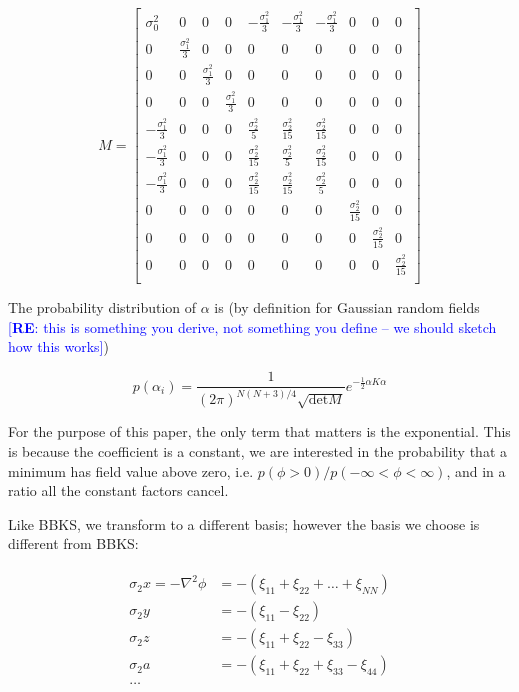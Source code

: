\documentclass[12pt]{article}
\newcommand{\re}[1]{\textcolor{blue}{[{\bf RE}: #1]}}
\begin{document}
\[
M=
  \begin{bmatrix}
    \sigma_0^2 & 0 & 0 & 0 & -\frac{\sigma_1^2}{3} &  -\frac{\sigma_1^2}{3} & -\frac{\sigma_1^2}{3} & 0 & 0 & 0\\
    0 & \frac{\sigma_1^2}{3} & 0 & 0 & 0 & 0 & 0 & 0 & 0 & 0\\
    0 & 0 & \frac{\sigma_1^2}{3} & 0 & 0 & 0 & 0 & 0 & 0 & 0\\
    0 & 0 & 0 & \frac{\sigma_1^2}{3} & 0 & 0 & 0 & 0 & 0 & 0\\
    -\frac{\sigma_1^2}{3} & 0 & 0 & 0 & \frac{\sigma_2^2}{5} & \frac{\sigma_2^2}{15} & \frac{\sigma_2^2}{15} & 0 & 0 & 0\\
    -\frac{\sigma_1^2}{3} & 0 & 0 & 0 & \frac{\sigma_2^2}{15} & \frac{\sigma_2^2}{5} & \frac{\sigma_2^2}{15} & 0 & 0 & 0\\
    -\frac{\sigma_1^2}{3} & 0 & 0 & 0 & \frac{\sigma_2^2}{15} & \frac{\sigma_2^2}{15} & \frac{\sigma_2^2}{5} & 0 & 0 & 0\\
    0 & 0 & 0 & 0 & 0 & 0 & 0 & \frac{\sigma_2^2}{15} & 0 & 0\\
    0 & 0 & 0 & 0 & 0 & 0 & 0 & 0 & \frac{\sigma_2^2}{15} & 0\\
    0 & 0 & 0 & 0 & 0 & 0 & 0 & 0 & 0 & \frac{\sigma_2^2}{15}\\
  \end{bmatrix}
\]

The probability distribution of $\alpha$ is (by definition for Gaussian random fields \re{this is something you derive, not something you define -- we should sketch how this works})

\begin{equation} \label{ProbDistrib}
p(\alpha_i)=\frac{1}{(2\pi)^{N(N+3)/4}\sqrt{\mathrm{det}M}} e^{-\frac{1}{2}\alpha K \alpha}
\end{equation}

For the purpose of this paper, the only term that matters is the exponential. This is because the coefficient is a constant, we are interested in the probability that a minimum has field value above zero, i.e. $p(\phi>0)/p(-\infty<\phi<\infty)$, and in a ratio all the constant factors cancel.

Like BBKS, we transform to a different basis; however the basis we choose is different from BBKS:

\begin{align*}
\begin{split}
\sigma_2x = -\nabla^2\phi &= -(\xi_{11}+\xi_{22}+\ldots+\xi_{NN})\\
\sigma_2y &= -(\xi_{11}-\xi_{22})\\
\sigma_2z &= -(\xi_{11}+\xi_{22}-\xi_{33})\\
\sigma_2a &= -(\xi_{11}+\xi_{22}+\xi_{33}-\xi_{44})\\
\ldots
\end{split}
\end{align*}
\end{document}
